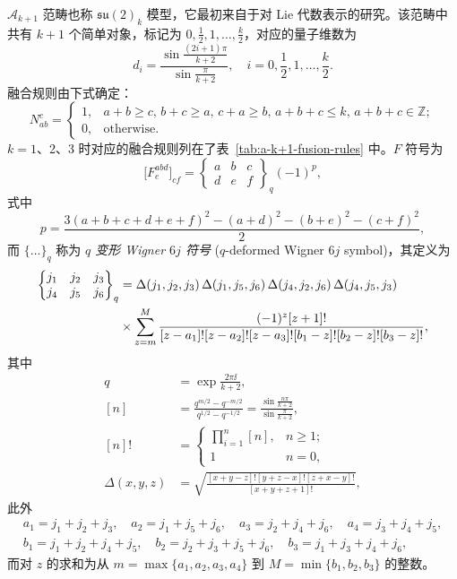 $\mathcal{A}_{k+1}$ 范畴\cite{coquereaux2007racah,gils2013anyonic,aasen2020topological,chen2022galois}也称 $\mathfrak{su}(2)_k$ 模型，它最初来自于对 Lie 代数表示的研究。该范畴中共有 $k+1$ 个简单对象，标记为 $0,\frac12,1,\dots,\frac k2$，对应的量子维数为
\begin{equation}
  d_i = \frac{\sin\frac{(2i+1)\pi}{k+2}}{\sin\frac{\pi}{k+2}}, \quad i = 0,\frac12,1,\dots,\frac k2.
\end{equation}
融合规则由下式确定：
\begin{equation}
  N_{ab}^c = \begin{cases}
    1, & a+b\geqslant c, \, b+c\geqslant a, \, c+a\geqslant b, \, a+b+c\leqslant k, \, a+b+c\in\mathbb{Z}; \\
    0, & \text{otherwise}.
  \end{cases}
\end{equation}
$k=1$、2、3 时对应的融合规则列在了表~\ref{tab:a-k+1-fusion-rules} 中。$F$ 符号为
\begin{equation}
  \bigl[ F^{abd}_e \bigr]_{cf} = \begin{Bmatrix} a & b & c \\ d & e & f \end{Bmatrix}_q (-1)^p,
\end{equation}
式中
\begin{equation}
  p = \frac{3(a+b+c+d+e+f)^2 - (a+d)^2 - (b+e)^2 - (c+f)^2}{2},
\end{equation}
而 $\{\dots\}_q$ 称为 \emph{$q$ 变形 Wigner $6j$ 符号} ($q$-deformed Wigner $6j$ symbol)，其定义为
\begin{align}
  \begin{Bmatrix} j_1 & j_2 & j_3 \\ j_4 & j_5 & j_6 \end{Bmatrix}_q
  &= \Delta(j_1,j_2,j_3) \, \Delta(j_1,j_5,j_6) \, \Delta(j_4,j_2,j_6) \, \Delta(j_4,j_5,j_3) \notag \\
  &\times \sum_{z=m}^M \frac{(-1)^z [z+1]!}{[z-a_1]![z-a_2]![z-a_3]! [b_1-z]![b_2-z]![b_3-z]!},
\end{align}
其中
\begin{align}
  q    &= \exp\frac{2\pi\ii}{k+2}, \\
  [n]  &= \frac{q^{m/2} - q^{-m/2}}{q^{1/2} - q^{-1/2}} = \frac{\sin\frac{n\pi}{k+2}}{\sin\frac{\pi}{k+2}}, \\
  [n]! &= \begin{cases}
    \prod_{i=1}^{n} [n], & n \geqslant 1; \\
    1                    & n = 0,
  \end{cases} \\
  \Delta(x,y,z) &= \sqrt{\frac{[x+y-z]! [y+z-x]! [z+x-y]!}{[x+y+z+1]!}},
\end{align}
此外
\begin{equation}
  \begin{gathered}
    a_1=j_1+j_2+j_3, \quad a_2=j_1+j_5+j_6, \quad a_3=j_2+j_4+j_6, \quad a_4=j_3+j_4+j_5, \\
    b_1=j_1+j_2+j_4+j_5, \quad b_2=j_2+j_3+j_5+j_6, \quad b_3=j_1+j_3+j_4+j_6,
  \end{gathered}
\end{equation}
而对 $z$ 的求和为从 $m=\max\{a_1,a_2,a_3,a_4\}$ 到 $M=\min\{b_1,b_2,b_3\}$ 的整数。

